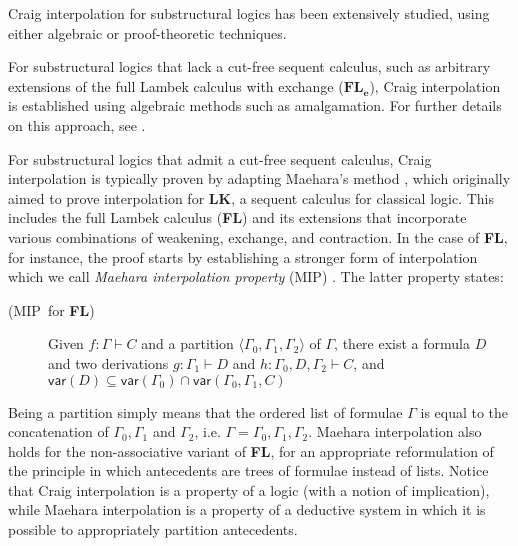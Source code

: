\documentclass[sn-mathphys-num]{sn-jnl}%
\newcommand{\GG}{\Gamma}
\newcommand{\mf}[1]{\mathsf{#1}}
\newcommand{\gs}[1]{\sigma_{X} (#1)}
\newcommand{\vars}[1]{\mf{var} (#1)}
\newcommand{\FL}{\textbf{FL}}
\newcommand{\MIP}{\textsf{MIP}}
\theoremstyle{thmstyleone}%
\theoremstyle{thmstyletwo}%
\theoremstyle{thmstylethree}%
\begin{document}
Craig interpolation for substructural logics has been extensively studied, using either algebraic or proof-theoretic techniques. 

For substructural logics that lack a cut-free sequent calculus, such as arbitrary extensions of the full Lambek calculus with exchange ($\FL_{\textbf{e}}$), Craig interpolation is established using algebraic methods such as amalgamation.
For further details on this approach, see \cite{Kihara2009}.

For substructural logics that admit a cut-free sequent calculus, Craig interpolation is typically proven by adapting Maehara's method \cite{maehara1961}, which originally aimed to prove interpolation for $\mathbf{LK}$, a sequent calculus for classical logic.
This includes the full Lambek calculus (\FL) and its extensions that incorporate various combinations of weakening, exchange, and contraction.
In the case of \FL, for instance, the proof starts by establishing a stronger form of interpolation which we call \emph{Maehara interpolation property} (\MIP) \cite{ono:proof:nonclassical:1998}. 
The latter property states:
\begin{description}
  \item[(\MIP~for \FL)] Given $f : \GG \vdash C$ and a partition $\langle \GG_0, \GG_1, \GG_2 \rangle$ of $\GG$, there exist a formula $D$ and two derivations $g : \GG_1 \vdash D$ and $h : \GG_0, D, \GG_2 \vdash C$, and $\vars{D} \subseteq \vars{\GG_0} \cap \vars{\GG_0, \GG_1, C}$
\end{description}
Being a partition simply means that the ordered list of formulae $\GG$ is equal to the concatenation of $\GG_0, \GG_1$ and $\GG_2$, i.e. $\GG = \GG_0, \GG_1, \GG_2$. 
Maehara interpolation also holds for the non-associative variant of \FL, for an appropriate reformulation of the principle in which antecedents are trees of formulae instead of lists.
Notice that Craig interpolation is a property of a logic (with a notion of implication), while Maehara interpolation is a property of a deductive system in which it is possible to appropriately partition antecedents.
\end{document}
